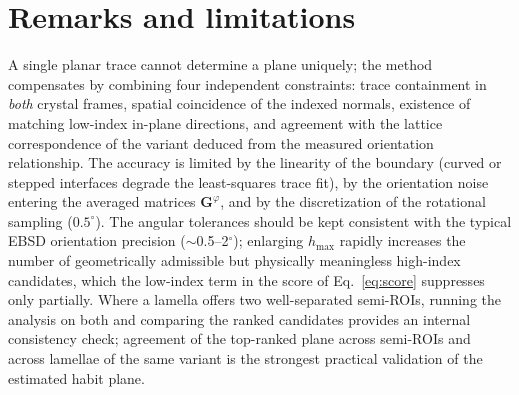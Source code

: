 \documentclass[11pt,a4paper]{article}
\newcommand{\mat}[1]{\mathbf{#1}}
\begin{document}
\section{Remarks and limitations}

A single planar trace cannot determine a plane uniquely; the method compensates by combining four independent constraints: trace containment in \emph{both} crystal frames, spatial coincidence of the indexed normals, existence of matching low-index in-plane directions, and agreement with the lattice correspondence of the variant deduced from the measured orientation relationship. The accuracy is limited by the linearity of the boundary (curved or stepped interfaces degrade the least-squares trace fit), by the orientation noise entering the averaged matrices $\mat G^{\varphi}$, and by the discretization of the rotational sampling ($0.5^\circ$). The angular tolerances should be kept consistent with the typical EBSD orientation precision ($\sim$0.5--2$^\circ$); enlarging $h_{\max}$ rapidly increases the number of geometrically admissible but physically meaningless high-index candidates, which the low-index term in the score of Eq.~\eqref{eq:score} suppresses only partially. Where a lamella offers two well-separated semi-ROIs, running the analysis on both and comparing the ranked candidates provides an internal consistency check; agreement of the top-ranked plane across semi-ROIs and across lamellae of the same variant is the strongest practical validation of the estimated habit plane.
\end{document}
